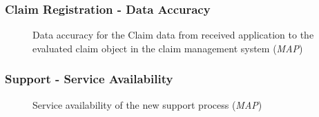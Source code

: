 \subsubsection{Claim Registration - Data Accuracy}
\label{sec:claim_analysis_to_be}
	\begin{center}
		\begin{figure}[H]
			\centering
			\setlength\fboxsep{7pt}
			\setlength\fboxrule{0.5pt}
			\caption{Data accuracy for the Claim data from received application to the evaluated claim object in the claim management system (\emph{MAP})}
			\label{fig:map_claim_data_to_be}
		\end{figure}
	\end{center}

%
\subsubsection{Support - Service Availability}
\label{sec:support_analysis_to_be}
\begin{center}
	\begin{figure}[H]
		\centering
		\setlength\fboxsep{7pt}
		\setlength\fboxrule{0.5pt}
		\caption{Service availability of the new support process (\emph{MAP})}
		\label{fig:map_support_combined_availability_to_be}
	\end{figure}
\end{center}


%







